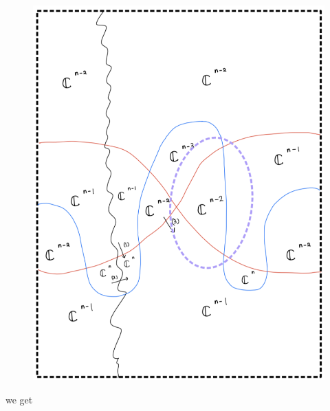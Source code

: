 \begin{enumerate}[label=(Step \arabic*)]
\begin{figure}[H]
    \centering
    \includegraphics[scale = 0.85]{diagrams/cobord'8/4.png}
    \caption{}
    \label{fig:your-label}
\end{figure}
\pagebreak
we get


\end{enumerate}
